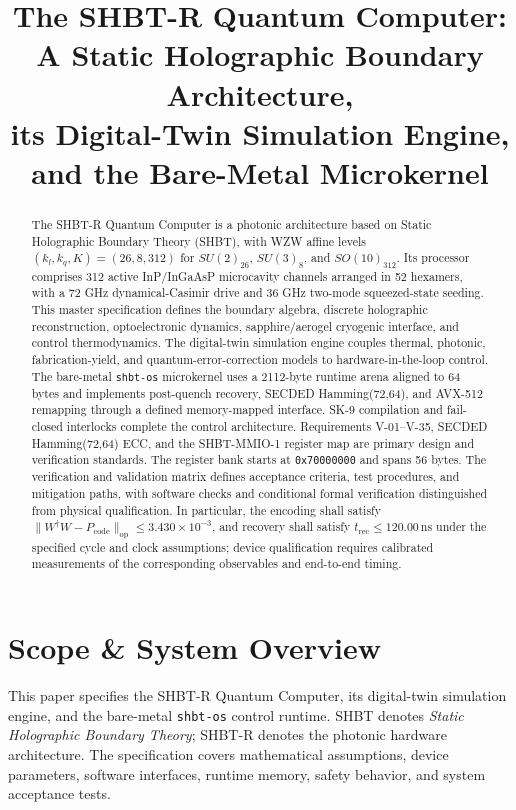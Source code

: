 \documentclass[11pt,a4paper]{article}
\title{\textbf{The SHBT-R Quantum Computer:\\
A Static Holographic Boundary Architecture,\\
its Digital-Twin Simulation Engine,\\
and the Bare-Metal \shbtos{} Microkernel}}
\author{}
\date{}
\newcommand{\op}{\mathrm{op}}
\newcommand{\code}{\mathrm{code}}
\newcommand{\unit}[1]{\,\mathrm{#1}}
\newcommand{\shbtos}{\texttt{shbt-os}}
\begin{document}
\maketitle
\begin{abstract}
The SHBT-R Quantum Computer is a photonic architecture based on Static Holographic
Boundary Theory (SHBT), with WZW affine levels $(k_l,k_q,K)=(26,8,312)$ for
$SU(2)_{26}$, $SU(3)_8$, and $SO(10)_{312}$. Its processor comprises 312 active
InP/InGaAsP microcavity channels arranged in 52 hexamers, with a 72 GHz
dynamical-Casimir drive and 36 GHz two-mode squeezed-state seeding. This master
specification defines the boundary algebra, discrete holographic reconstruction,
optoelectronic dynamics, sapphire/aerogel cryogenic interface, and control thermodynamics.
The digital-twin simulation engine couples thermal, photonic, fabrication-yield, and
quantum-error-correction models to hardware-in-the-loop control. The bare-metal
\shbtos{} microkernel uses a 2112-byte runtime arena aligned to 64 bytes and implements
post-quench recovery, SECDED Hamming(72,64), and AVX-512 remapping through a defined
memory-mapped interface. SK-9 compilation and fail-closed interlocks complete the
control architecture. Requirements V-01--V-35, SECDED Hamming(72,64) ECC, and the
SHBT-MMIO-1 register map are primary design and verification standards. The register
bank starts at \texttt{0x70000000} and spans 56 bytes. The verification and validation
matrix defines acceptance criteria, test procedures, and mitigation paths, with software checks and
conditional formal verification distinguished from physical qualification. In particular,
the encoding shall satisfy $\|W^\dagger W-P_\code\|_\op\le3.430\times10^{-3}$,
and recovery shall satisfy $t_{\mathrm{rec}}\le120.00\unit{ns}$
under the specified cycle and clock assumptions; device qualification requires calibrated
measurements of the corresponding observables and end-to-end timing.
\end{abstract}
\clearpage
\tableofcontents
\clearpage

\section{Scope \& System Overview}
\label{sec:scope}
This paper specifies the SHBT-R Quantum Computer, its digital-twin simulation engine,
and the bare-metal \shbtos{} control runtime. SHBT denotes \emph{Static Holographic
Boundary Theory}; SHBT-R denotes the photonic hardware architecture. The specification
covers mathematical assumptions, device parameters, software interfaces, runtime memory,
safety behavior, and system acceptance tests.
\end{document}
